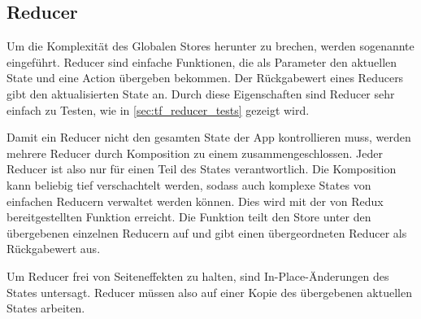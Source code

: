 \subsection{Reducer}
\label{ssec:gr_reducer}

Um die Komplexität des Globalen Stores herunter zu brechen, werden sogenannte
 eingeführt.  Reducer sind einfache Funktionen, die
als Parameter den aktuellen State und eine Action übergeben bekommen.  Der
Rückgabewert eines Reducers gibt den aktualisierten State an.  Durch diese
Eigenschaften sind Reducer sehr einfach zu Testen, wie in
\cref{sec:tf_reducer_tests} gezeigt wird.

Damit ein Reducer nicht den gesamten State der App kontrollieren muss, werden
mehrere Reducer durch Komposition zu einem zusammengeschlossen.  Jeder Reducer
ist also nur für einen Teil des States verantwortlich.  Die Komposition kann
beliebig tief verschachtelt werden, sodass auch komplexe States von einfachen
Reducern verwaltet werden können.  Dies wird mit der von Redux bereitgestellten
Funktion  erreicht.  Die Funktion teilt den Store unter
den übergebenen einzelnen Reducern auf und gibt einen übergeordneten Reducer als
Rückgabewert aus.

Um Reducer frei von Seiteneffekten zu halten, sind In-Place-Änderungen des
States untersagt.  Reducer müssen also auf einer Kopie des übergebenen aktuellen
States arbeiten.
